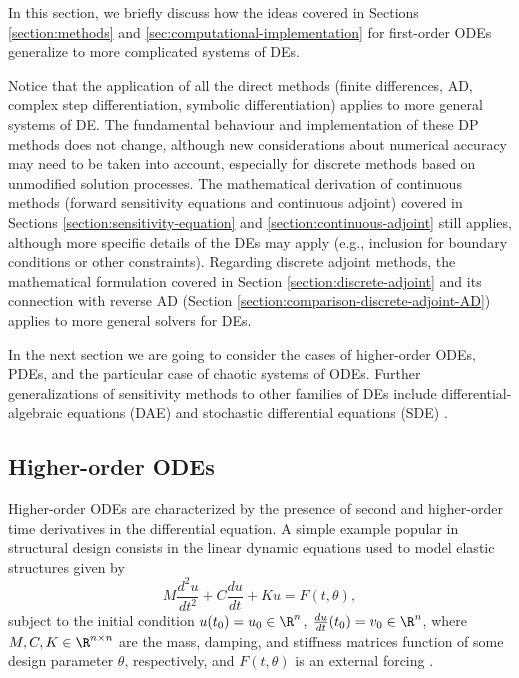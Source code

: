 In this section, we briefly discuss how the ideas covered in Sections \ref{section:methods} and \ref{sec:computational-implementation} for first-order ODEs generalize to more complicated systems of DEs. 

Notice that the application of all the direct methods (finite differences, AD, complex step differentiation, symbolic differentiation) applies to more general systems of DE.
The fundamental behaviour and implementation of these DP methods does not change, although new considerations about numerical accuracy may need to be taken into account, especially for discrete methods based on unmodified solution processes.  
The mathematical derivation of continuous methods (forward sensitivity equations and continuous adjoint) covered in Sections \ref{section:sensitivity-equation} and \ref{section:continuous-adjoint} still applies, although more specific details of the DEs may apply (e.g., inclusion for boundary conditions or other constraints). 
Regarding discrete adjoint methods, the mathematical formulation covered in Section \ref{section:discrete-adjoint} and its connection with reverse AD (Section \ref{section:comparison-discrete-adjoint-AD}) applies to more general solvers for DEs. 

In the next section we are going to consider the cases of higher-order ODEs, PDEs, and the particular case of chaotic systems of ODEs. 
Further generalizations of sensitivity methods to other families of DEs include differential-algebraic equations (DAE) \cite{Cao_Li_Petzold_2002} and stochastic differential equations (SDE) \cite{li2020scalable}. 

\subsection{Higher-order ODEs}

Higher-order ODEs are characterized by the presence of second and higher-order time derivatives in the differential equation. 
A simple example popular in structural design consists in the linear dynamic equations used to model elastic structures given by 
\begin{equation}
    M \frac{d^2 u}{dt^2}
    +
    C \frac{du}{dt}
    + 
    K u
    = 
    F(t, \theta),
\end{equation}
subject to the initial condition $u(t_0) = u_0 \in \R^n$, $\frac{du}{dt}(t_0) = v_0 \in \R^n$, where $M, C, K \in \R^{n \times n}$ are the mass, damping, and stiffness matrices function of some design parameter $\theta$, respectively, and $F(t, \theta)$ is an external forcing \cite{min1999optimal, Jensen_Nakshatrala_Tortorelli_2014}.  

